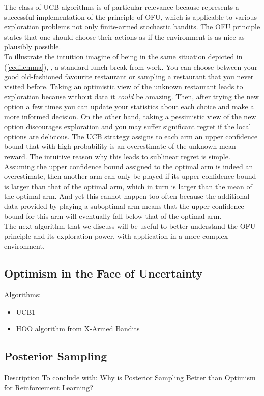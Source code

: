 The class of \gls{UCB} algorithms is of particular relevance because represents a successful implementation of the principle of \gls{OFU}, which is applicable to various exploration problems not only finite-armed
stochastic bandits. The \gls{OFU} principle states that one should choose their actions as if the environment is as nice as plausibly possible. \\
To illustrate the intuition imagine of being in the same situation depicted in (\ref{eedilemma}), \ie, a standard lunch break from work. You can choose between your good old-fashioned favourite restaurant or sampling a restaurant that you never visited before. Taking an optimistic view of the unknown restaurant leads to exploration because without data it \emph{could} be amazing. Then, after trying the new option a few times you can update your statistics about each choice and make a more
informed decision. On the other hand, taking a pessimistic view of the new option discourages exploration and you may suffer significant regret if the local options are delicious. The \gls{UCB} strategy assigns to each arm an upper confidence bound  that with high probability is an overestimate of the unknown mean reward. The intuitive reason why
this leads to sublinear regret is simple. Assuming the upper confidence bound assigned to the optimal arm is indeed an overestimate, then another arm can only be played if its upper confidence bound is larger than that of the optimal arm, which in turn is larger than the mean of the optimal arm. And yet this cannot happen too often because the additional data provided by playing a suboptimal arm means that the upper confidence bound for this arm will eventually fall below that of the optimal arm.\\
The next algorithm that we discuss will be useful to better understand the \gls{OFU} principle and its exploration power, with application in a more complex environment.

\subsection{Optimism in the Face of Uncertainty}
Algorithms:
\begin{itemize}
\item UCB1
\item  HOO algorithm from X-Armed Bandits \cite{bubeck2011x} 
\end{itemize}

\subsection{Posterior Sampling}
Description
To conclude with: Why is Posterior Sampling Better than Optimism for Reinforcement Learning? \cite{osband2017posterior}

